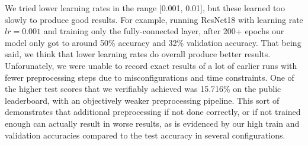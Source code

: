 We tried lower learning rates in the range [0.001, 0.01], but these learned too slowly to produce good results. For example, running ResNet18 with learning rate $lr = 0.001$ and training only the fully-connected layer, after 200+ epochs our model only got to around 50\% accuracy and 32\% validation accuracy. That being said, we think that lower learning rates do overall produce better results. Unforunately, we were unable to record exact results of a lot of earlier runs with fewer preprocessing steps due to misconfigurations and time constraints. One of the higher test scores that we verifiably achieved was 15.716\% on the public leaderboard, with an objectively weaker preprocessing pipeline. This sort of demonstrates that additional preprocessing if not done correctly, or if not trained enough can actually result in worse results, as is evidenced by our high train and validation accuracies compared to the test accuracy in several configurations.

